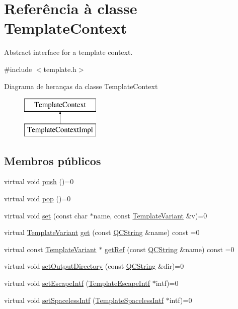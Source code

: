 \hypertarget{class_template_context}{\section{Referência à classe Template\-Context}
\label{class_template_context}
}


Abstract interface for a template context.  




{\ttfamily \#include $<$template.\-h$>$}

Diagrama de heranças da classe Template\-Context\begin{figure}[H]
\begin{center}
\leavevmode
\includegraphics[height=2.000000cm]{class_template_context}
\end{center}
\end{figure}
\subsection*{Membros públicos}
\begin{DoxyCompactItemize}
\item 
virtual void \hyperlink{class_template_context_a7a28d6e6a6ded476c1774baac1cb3448}{push} ()=0
\item 
virtual void \hyperlink{class_template_context_a155389a22ff3694e7a6af1777f6d7182}{pop} ()=0
\item 
virtual void \hyperlink{class_template_context_af83899afa5416ea422089aed8facf318}{set} (const char $\ast$name, const \hyperlink{class_template_variant}{Template\-Variant} \&v)=0
\item 
virtual \hyperlink{class_template_variant}{Template\-Variant} \hyperlink{class_template_context_adb49a5675ac3cb569a86fbaf8409e9e8}{get} (const \hyperlink{class_q_c_string}{Q\-C\-String} \&name) const =0
\item 
virtual const \hyperlink{class_template_variant}{Template\-Variant} $\ast$ \hyperlink{class_template_context_a3a146aa3fd2f25dccb45f2b3eda64174}{get\-Ref} (const \hyperlink{class_q_c_string}{Q\-C\-String} \&name) const =0
\item 
virtual void \hyperlink{class_template_context_ace9ddbfb0b3770eea371a78a16060a73}{set\-Output\-Directory} (const \hyperlink{class_q_c_string}{Q\-C\-String} \&dir)=0
\item 
virtual void \hyperlink{class_template_context_ac592d6d28ead803976089a11e60613af}{set\-Escape\-Intf} (\hyperlink{class_template_escape_intf}{Template\-Escape\-Intf} $\ast$intf)=0
\item 
virtual void \hyperlink{class_template_context_a01a5c35d9a02935589e8dbef1c8568bf}{set\-Spaceless\-Intf} (\hyperlink{class_template_spaceless_intf}{Template\-Spaceless\-Intf} $\ast$intf)=0
\end{DoxyCompactItemize}


